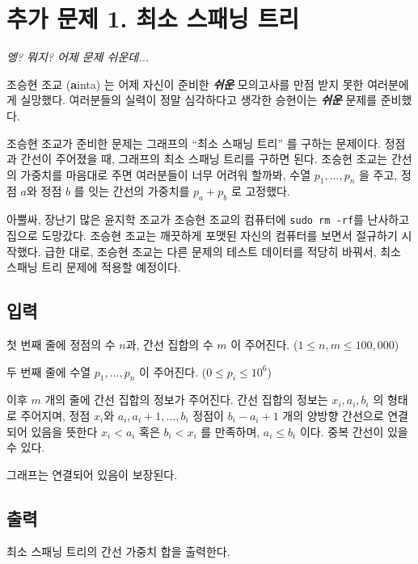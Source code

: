 \documentclass{article}
\begin{document}
	
\section{추가 문제 1. 최소 스패닝 트리}

\begin{center}
	\textit{엥? 뭐지? 어제 문제 쉬운데...}
\end{center}
조승현 조교 (\textbf{a}inta) 는 어제 자신이 준비한 \textbf{\textit{쉬운}} 모의고사를 만점 받지 못한 여러분에게 실망했다. 여러분들의 실력이 정말 심각하다고 생각한 승현이는 \textbf{\textit{쉬운}} 문제를 준비했다. \newline

조승현 조교가 준비한 문제는 그래프의 ``최소 스패닝 트리'' 를 구하는 문제이다. 정점과 간선이 주어졌을 때, 그래프의 최소 스패닝 트리를 구하면 된다. 조승현 조교는 간선의 가중치를 마음대로 주면 여러분들이 너무 어려워 할까봐, 수열 $p_1, ..., p_n$ 을 주고, 정점  $a$와 정점 $b$ 를 잇는 간선의 가중치를 $p_a + p_b$ 로 고정했다. \newline

아뿔싸, 장난기 많은 윤지학 조교가 조승현 조교의 컴퓨터에 \texttt{sudo rm -rf}를 난사하고 집으로 도망갔다. 조승현 조교는 깨끗하게 포맷된 자신의 컴퓨터를 보면서 절규하기 시작했다. 급한 대로, 조승현 조교는 다른 문제의 테스트 데이터를 적당히 바꿔서, 최소 스패닝 트리 문제에 적용할 예정이다.

\subsection{입력}
첫 번째 줄에 정점의 수 $n$과, 간선 집합의 수 $m$ 이 주어진다. ($1 \leq n, m \leq 100,000$) \newline

두 번째 줄에 수열 $p_1, ..., p_n$ 이 주어진다. ($0 \leq p_i \leq 10^6$) \newline

이후 $m$ 개의 줄에 간선 집합의 정보가 주어진다. 간선 집합의 정보는 $x_i, a_i, b_i$ 의 형태로 주어지며, 정점 $x_i$와 $a_i, a_i + 1, ..., b_i$ 정점이 $b_i - a_i + 1$ 개의 양방향 간선으로 연결되어 있음을 뜻한다 $x_i < a_i$ 혹은 $b_i < x_i$ 를 만족하며, $a_i \leq b_i$ 이다. 중복 간선이 있을 수 있다. \newline

그래프는 연결되어 있음이 보장된다.

\subsection{출력}
최소 스패닝 트리의 간선 가중치 합을 출력한다.
\end{document}
